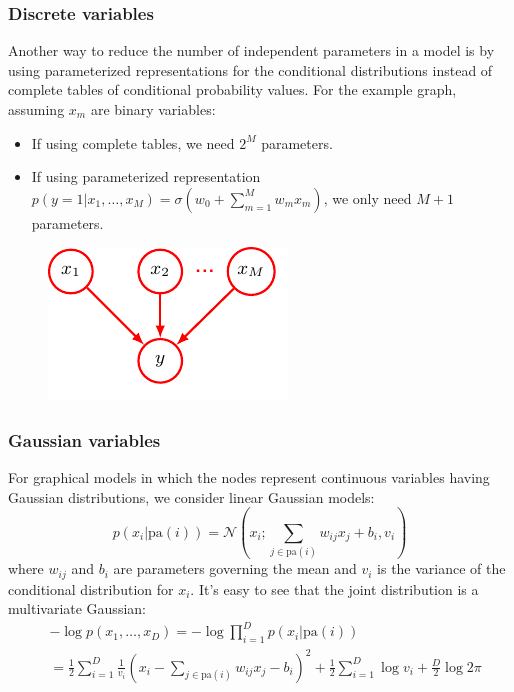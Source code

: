 \documentclass{beamer}
\begin{document}
\begin{frame}
    \frametitle{Discrete variables}
    Another way to reduce the number of independent parameters in a model is by using parameterized representations for the conditional distributions instead of complete tables of conditional probability values. For the example graph, assuming $x_{m}$ are binary variables:
    \begin{itemize}
        \item If using complete tables, we need $2^{M}$ parameters.
        \item If using parameterized representation $p(y=1|x_{1},\hdots,x_{M})=\sigma(w_{0}+\sum_{m=1}^{M}w_{m}x_{m})$, we only need $M+1$ parameters.
    \end{itemize}
    \begin{figure}
        \includegraphics{Figure_6.pdf}
    \end{figure}
\end{frame}

\begin{frame}
    \frametitle{Gaussian variables}
    For graphical models in which the nodes represent continuous variables having Gaussian distributions, we consider linear Gaussian models:
    \begin{equation*}
        p(x_{i}|\mathrm{pa}(i))=\mathcal{N}(x_{i};\sum_{j\in\mathrm{pa}(i)}w_{ij}x_{j}+b_{i},v_{i})
    \end{equation*}
    where $w_{ij}$ and $b_{i}$ are parameters governing the mean and $v_{i}$ is the variance of the conditional distribution for $x_{i}$. It's easy to see that the joint distribution is a multivariate Gaussian:
    \begin{align*}
        &-\log{}p(x_{1},\hdots,x_{D})=-\log\prod_{i=1}^{D}p(x_{i}|\mathrm{pa}(i)) \\
        &=\frac{1}{2}\sum_{i=1}^{D}\frac{1}{v_{i}}(x_{i}-\sum_{j\in\mathrm{pa}(i)}w_{ij}x_{j}-b_{i})^{2}+\frac{1}{2}\sum_{i=1}^{D}\log{}v_{i}+\frac{D}{2}\log{}2\pi
    \end{align*}
\end{frame}
\end{document}
